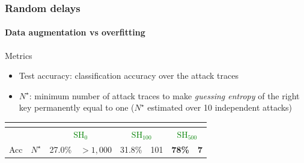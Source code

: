\begin{frame}
\frametitle{Random delays}
\framesubtitle{Data augmentation vs overfitting}
\vspace{-8pt}
\begin{block}{Metrics}
\begin{itemize}
\item Test accuracy: classification accuracy over the attack traces
\item $N^\star$: minimum number of attack traces to make \emph{guessing entropy} of the right key permanently equal to one ($N^\star$ estimated over 10 independent attacks)
\end{itemize}
\end{block}


\begin{figure}
\captionsetup[subfigure]{labelformat=empty}
\end{figure}

\pause
\vspace*{-15pt}
\begin{table}
\begin{tabular}{|c|c|c|c|c|c|c|c|}
\multicolumn{8}{c}{}\\
\hline
\multicolumn{2}{|c|}{} & \multicolumn{2}{c|}{\textcolor{green}{$\mathrm{SH}_{0}$}} & \multicolumn{2}{c|}{\textcolor{green}{$\mathrm{SH}_{100}$}} & \multicolumn{2}{c|}{\textcolor{green}{$\mathrm{SH}_{500}$}} \\ \hline
Acc        & $N^\star$       & 27.0\%                      & $>1,000$                      & 31.8\%                       & 101                         & \textbf{78\%}              & \textbf{7}                \\ \hline
\end{tabular}
\end{table}
%
\end{frame}
